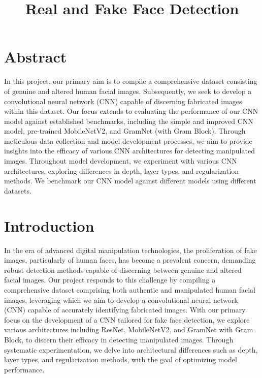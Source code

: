 \documentclass[rebuttal]{cvpr}
\begin{document}
\title{Real and Fake Face Detection}  %

\maketitle
\thispagestyle{empty}


\section{Abstract}
In this project, our primary aim is to compile a comprehensive dataset consisting of genuine and altered human facial images. Subsequently, we seek to develop a convolutional neural network (CNN) capable of discerning fabricated images within this dataset. Our focus extends to evaluating the performance of our CNN model against established benchmarks, including the simple and improved CNN model, pre-trained MobileNetV2, and GramNet (with Gram Block). Through meticulous data collection and model development processes, we aim to provide insights into the efficacy of various CNN architectures for detecting manipulated images. Throughout model development, we experiment with various CNN architectures, exploring differences in depth, layer types, and regularization methods. We benchmark our CNN model against different models using different datasets.
 

\section{Introduction}

In the era of advanced digital manipulation technologies, the proliferation of fake images, particularly of human faces, has become a prevalent concern, demanding robust detection methods capable of discerning between genuine and altered facial images. Our project responds to this challenge by compiling a comprehensive dataset comprising both authentic and manipulated human facial images, leveraging which we aim to develop a convolutional neural network (CNN) capable of accurately identifying fabricated images. With our primary focus on the development of a CNN tailored for fake face detection, we explore various architectures including ResNet, MobileNetV2, and GramNet with Gram Block, to discern their efficacy in detecting manipulated images. Through systematic experimentation, we delve into architectural differences such as depth, layer types, and regularization methods, with the goal of optimizing model performance.
 
\end{document}

